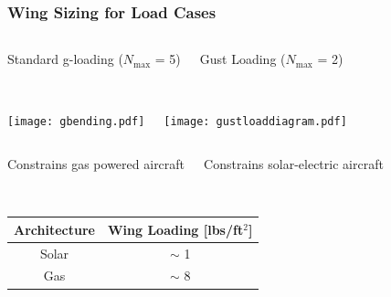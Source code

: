 \documentclass{beamer}
\begin{document}
\begin{frame}
    \frametitle{Wing Sizing for Load Cases}
      
    \begin{columns}
        \begin{center}
        Standard g-loading ($N_{\text{max}}$ = 5) \\~\\
        \end{center}
        
        \begin{center}
        Gust Loading ($N_{\text{max}}$ = 2) \\~\\
        \end{center}
    \end{columns}

    \pause

    \begin{columns}
        \texttt{[image: gbending.pdf]}
        
        \texttt{[image: gustloaddiagram.pdf]}
    \end{columns}
    
    \pause
    \begin{columns}
        \begin{center}
        Constrains gas powered aircraft \\~\\
        \end{center}
        
        \begin{center}
        Constrains solar-electric aircraft \\~\\
        \end{center}
    \end{columns}

    \pause
    \begin{table}[]
        \centering
        \begin{tabular}{cc}
            Architecture & Wing Loading [lbs/ft$^2$] \\ \hline
            Solar        & $\sim$ 1                        \\
            Gas          & $\sim$ 8                       
        \end{tabular}
    \end{table}
\end{frame}
\end{document}
